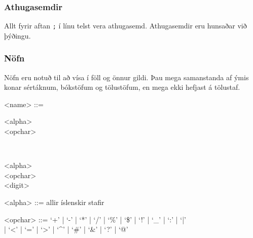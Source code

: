 \documentclass[a4paper,icelandic]{article}
\begin{document}
\subsubsection{Athugasemdir}
\label{sec:athugasemdir}
Allt fyrir aftan \verb|;| í línu telst vera athugasemd. Athugasemdir
eru hunsaðar við þýðingu.

\subsubsection{Nöfn}
\label{sec:nofn}
Nöfn  eru notuð til að vísa í föll og önnur gildi. Þau mega
samanstanda af ýmis konar sértáknum, bókstöfum og tölustöfum, en mega
ekki hefjast á tölustaf.
\begin{grammar}
  <name> ::=
  \begin{syntdiag*}
    \begin{stack}
      <alpha>\\
      <opchar>
    \end{stack}
    \begin{rep} \\
      \begin{stack}
        <alpha>\\
        <opchar> \\
        <digit>
      \end{stack}
    \end{rep}
  \end{syntdiag*}

  <alpha> ::= allir íslenskir stafir

  <opchar> ::= `+' | `-' | `*' | `/' | `\%' | `\$' | `!' | `_' | `:' |
  `|' \\ | `<' | `=' | `>' | `^' | `#' | `\&' | `?' | `@'
\end{grammar}
\end{document}
